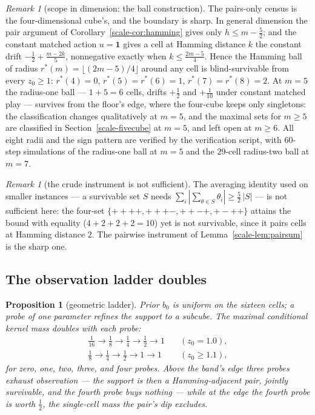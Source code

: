 \documentclass[10pt,twocolumn]{article}
\theoremstyle{plain}
\newtheorem{proposition}[theorem]{Proposition}
\theoremstyle{definition}
\theoremstyle{remark}
\newtheorem{remark}[theorem]{Remark}
\begin{document}
\begin{remark}[scope in dimension: the ball construction]
\label{scale-rem:scope}
The pairs-only census is the four-dimensional cube's, and the boundary
is sharp. In general dimension the pair argument of
Corollary~\ref{scale-cor:hamming} gives only \(h \le m - \tfrac52\); and
the constant matched action \(u = \mathbf{1}\) gives a cell at
Hamming distance \(k\) the constant drift
\(-\tfrac12 + \tfrac{m - 2k}{5}\), nonnegative exactly when
\(k \le \tfrac{2m-5}{4}\). Hence the Hamming ball of radius
\(r^{*}(m) = \lfloor (2m - 5)/4 \rfloor\) around any cell is
blind-survivable from every \(z_{0} \ge 1\):
\(r^{*}(4) = 0\), \(r^{*}(5) = r^{*}(6) = 1\),
\(r^{*}(7) = r^{*}(8) = 2\). At \(m = 5\) the radius-one ball ---
\(1 + 5 = 6\) cells, drifts \(+\tfrac12\) and \(+\tfrac1{10}\)
under constant matched play --- survives from the floor's edge, where
the four-cube keeps only singletons: the classification changes
qualitatively at \(m = 5\), and the maximal sets for \(m \ge 5\) are classified in Section~\ref{scale-fivecube} at \(m = 5\), and left open at \(m \ge 6\). All eight radii and the sign pattern are
verified by the verification script, with \(60\)-step simulations of the
radius-one ball at \(m = 5\) and the \(29\)-cell radius-two ball at
\(m = 7\).
\end{remark}

\begin{remark}[the crude instrument is not sufficient]
\label{scale-rem:crude}
The averaging identity used on smaller instances --- a survivable set
\(S\) needs \(\sum_{i} |\sum_{\theta \in S} \theta_{i}| \ge
\tfrac52\,|S|\) --- is not sufficient here: the four-set
\(\{++++, +++-, ++-+, +-++\}\) attains the bound with equality
(\(4 + 2 + 2 + 2 = 10\)) yet is not survivable, since it pairs cells
at Hamming distance \(2\). The pairwise instrument of
Lemma~\ref{scale-lem:pairsum} is the sharp one.
\end{remark}

\subsection{The observation ladder doubles}\label{scale-ladder}

\begin{proposition}[geometric ladder]\label{scale-prop:ladder}
Prior \(b_{0}\) is uniform on the sixteen cells; a probe of one
parameter refines the support to a subcube. The maximal conditional
kernel mass doubles with each probe:
\begin{align*}
\tfrac1{16} \to \tfrac18 \to \tfrac14 \to \tfrac12 \to 1
&\quad (z_{0} = 1.0),\\
\tfrac18 \to \tfrac14 \to \tfrac12 \to 1 \to 1
&\quad (z_{0} \ge 1.1),
\end{align*}
for zero, one, two, three, and four probes. Above the band's edge
three probes exhaust observation --- the support is then a
Hamming-adjacent pair, jointly survivable, and the fourth probe buys
nothing --- while at the edge the fourth probe is worth
\(\tfrac12\), the single-cell mass the pair's dip excludes.
\end{proposition}
\end{document}
